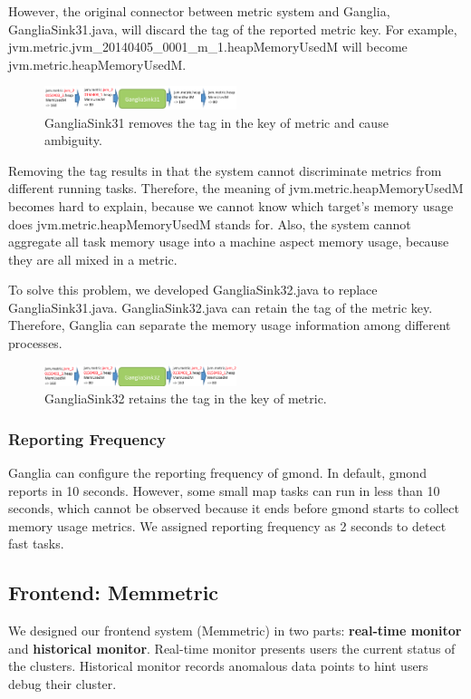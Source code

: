 However, the original connector between metric system and Ganglia, GangliaSink31.java, will discard the tag of the reported metric key. For example, jvm.metric.jvm\_20140405\_0001\_m\_1.heapMemoryUsedM will become jvm.metric.heapMemoryUsedM. 

\begin{figure}[h!]
  \centering
    \includegraphics[width=0.5\textwidth]{image/ganglia31_flow.png}
  \caption{GangliaSink31 removes the tag in the key of metric and cause ambiguity.}
\end{figure}

Removing the tag results in that the system cannot discriminate metrics from different running tasks. Therefore, the meaning of jvm.metric.heapMemoryUsedM becomes hard to explain, because we cannot know which target's memory usage does  jvm.metric.heapMemoryUsedM stands for. Also, the system cannot aggregate all task memory usage into a machine aspect memory usage, because they are all mixed in a metric. 

To solve this problem, we developed GangliaSink32.java to replace GangliaSink31.java. GangliaSink32.java can retain the tag of the metric key. Therefore, Ganglia can separate the memory usage information among different processes. 

\begin{figure}[h!]
  \centering
  \includegraphics[width=0.5\textwidth]{image/ganglia32_flow.png}
  \caption{GangliaSink32 retains the tag in the key of metric.}
\end{figure}

\subsubsection{Reporting Frequency}

Ganglia can configure the reporting frequency of gmond.  In default, gmond reports in 10 seconds. However, some small map tasks can run in less than 10 seconds, which cannot be observed because it ends before gmond starts to collect memory usage metrics. 
We assigned reporting frequency as 2 seconds to detect fast tasks.

\subsection{Frontend: Memmetric}
We designed our frontend system (Memmetric) in two parts: \textbf{real-time monitor} and \textbf{historical monitor}. Real-time monitor  presents users the current status of the clusters. Historical monitor records anomalous data points to hint users debug their cluster.

